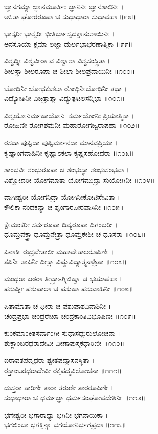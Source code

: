 ಜ್ಞಾನಗಮ್ಯಾ ಜ್ಞಾನಮೂರ್ತಿಃ ಜ್ಞಾನಿನೀ ಜ್ಞಾನಶಾಲಿನೀ ।\\
ಅಸಿತಾ ಘೋರರೂಪಾ ಚ ಸುಧಾಧಾರಾ ಸುಧಾವಹಾ ॥೯೮॥

ಭಾಸ್ಕರೀ ಭಾಸ್ವರೀ ಭೀತಿರ್ಭಾಸ್ವದಕ್ಷಾನುಶಾಯಿನೀ ।\\
ಅನಸೂಯಾ ಕ್ಷಮಾ ಲಜ್ಜಾ ದುರ್ಲಭಾಭರಣಾತ್ಮಿಕಾ ॥೯೯॥

ವಿಶ್ವಧ್ನೀ ವಿಶ್ವವೀರಾ ವ ವಿಶ್ವಾಶಾ ವಿಶ್ವಸಂಸ್ಥಿತಾ ।\\
ಶೀಲಸ್ಥಾ ಶೀಲರೂಪಾ ಚ ಶೀಲಾ ಶೀಲಪ್ರದಾಯಿನೀ ॥೧೦೦॥

ಬೋಧಿನೀ ಬೋಧಕುಶಲಾ ರೋಧಿನೀಬೋಧಿನೀ ತಥಾ ।\\
ವಿದ್ಯೋತಿನೀ ವಿಚಿತ್ರಾತ್ಮಾ ವಿದ್ಯುತ್ಪಟಲಸನ್ನಿಭಾ ॥೧೦೧॥

ವಿಶ್ವಯೋನಿರ್ಮಹಾಯೋನಿಃ ಕರ್ಮಯೋನಿಃ ಪ್ರಿಯಾತ್ಮಿಕಾ ।\\

ರೋಹಿಣೀ ರೋಗಶಮನೀ ಮಹಾರೋಗಜ್ವರಾಪಹಾ ॥೧೦೨॥

ರಸದಾ ಪುಷ್ಟಿದಾ ಪುಷ್ಟಿರ್ಮಾನದಾ ಮಾನವಪ್ರಿಯಾ ।\\
ಕೃಷ್ಣಾಂಗವಾಹಿನೀ ಕೃಷ್ಣಾಽಕಲಾ ಕೃಷ್ಣಸಹೋದರಾ ॥೧೦೩॥

ಶಾಂಭವೀ ಶಂಭುರೂಪಾ ಚ ಶಂಭುಸ್ಥಾ ಶಂಭುಸಂಭವಾ ।\\
ವಿಶ್ವೋದರೀ ಯೋಗಮಾತಾ ಯೋಗಮುದ್ರಾ ಸುಯೋಗಿನೀ ॥೧೦೪॥

ವಾಗೀಶ್ವರೀ ಯೋಗನಿದ್ರಾ ಯೋಗಿನೀಕೋಟಿಸೇವಿತಾ ।\\
ಕೌಲಿಕಾ ನಂದಕನ್ಯಾ ಚ ಶೃಂಗಾರಪೀಠವಾಸಿನೀ ॥೧೦೫॥

ಕ್ಷೇಮಂಕರೀ ಸರ್ವರೂಪಾ ದಿವ್ಯರೂಪಾ ದಿಗಂಬರೀ ।\\
ಧೂಮ್ರವಕ್ತ್ರಾ ಧೂಮ್ರನೇತ್ರಾ ಧೂಮ್ರಕೇಶೀ ಚ ಧೂಸರಾ ॥೧೦೬॥

ಪಿನಾಕೀ ರುದ್ರವೇತಾಲೀ ಮಹಾವೇತಾಲರೂಪಿಣೀ ।\\
ತಪಿನೀ ತಾಪಿನೀ ದೀಕ್ಷಾ ವಿಷ್ಣುವಿದ್ಯಾತ್ಮನಾಶ್ರಿತಾ ॥೧೦೭॥

ಮಂಥರಾ ಜಠರಾ ತೀವ್ರಾಽಗ್ನಿಜಿಹ್ವಾ ಚ ಭಯಾಪಹಾ ।\\
ಪಶುಘ್ನೀ ಪಶುಪಾಲಾ ಚ ಪಶುಹಾ ಪಶುವಾಹಿನೀ ॥೧೦೮॥

ಪಿತಾಮಾತಾ ಚ ಧೀರಾ ಚ ಪಶುಪಾಶವಿನಾಶಿನೀ ।\\
ಚಂದ್ರಪ್ರಭಾ ಚಂದ್ರರೇಖಾ ಚಂದ್ರಕಾಂತಿವಿಭೂಷಿಣೀ ॥೧೦೯॥

ಕುಂಕಮಾಂಕಿತಸರ್ವಾಂಗೀ ಸುಧಾಸದ್ಗುರುಲೋಚನಾ ।\\
ಶುಕ್ಲಾಂಬರಧರಾದೇವೀ ವೀಣಾಪುಸ್ತಕಧಾರಿಣೀ ॥೧೧೦॥

ಐರಾವತಪದ್ಮಧರಾ ಶ್ವೇತಪದ್ಮಾಸನಸ್ಥಿತಾ ।\\
ರಕ್ತಾಂಬರಧರಾದೇವೀ ರಕ್ತಪದ್ಮವಿಲೋಚನಾ ॥೧೧೧॥

ದುಸ್ತರಾ ತಾರಿಣೀ ತಾರಾ ತರುಣೀ ತಾರರೂಪಿಣೀ ।\\
ಸುಧಾಧಾರಾ ಚ ಧರ್ಮಜ್ಞಾ ಧರ್ಮಸಂಘೋಪದೇಶಿನೀ ॥೧೧೨॥

ಭಗೇಶ್ವರೀ ಭಗಾರಾಧ್ಯಾ ಭಗಿನೀ ಭಗನಾಯಿಕಾ ।\\
ಭಗಬಿಂಬಾ ಭಗಕ್ಲಿನ್ನಾ ಭಗಯೋನಿರ್ಭಗಪ್ರದಾ ॥೧೧೩॥

